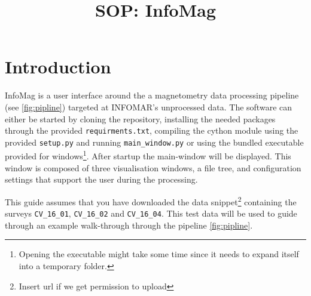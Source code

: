 \documentclass[12pt]{article}
\title{SOP: InfoMag}
\theoremstyle{definition}
\begin{document}
	
	\maketitle
	\tableofcontents
	
\section{Introduction}
InfoMag is a user interface around the a magnetometry data processing pipeline (see \ref{fig:pipline}) targeted at INFOMAR's unprocessed data.
The software can either be started by cloning the repository, installing the needed packages through the provided \verb|requirments.txt|, compiling the cython module using the provided \verb|setup.py| and running \verb|main_window.py| or using the bundled executable provided for windows\footnote{Opening the executable might take some time since it needs to expand itself into a temporary folder.}.
After startup the main-window will be displayed.
This window is composed of three visualisation windows, a file tree, and configuration settings that support the user during the processing.

This guide assumes that you have downloaded the data snippet\footnote{Insert url if we get permission to upload} containing the surveys \verb|CV_16_01|, \verb|CV_16_02| and \verb|CV_16_04|.
This test data will be used to guide through an example walk-through through the pipeline \ref{fig:pipline}.
\end{document}
